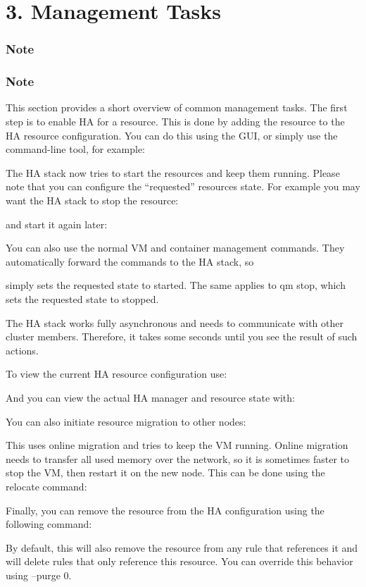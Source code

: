 \section{3. Management Tasks}

\subsubsection{Note}

\subsubsection{Note}

This section provides a short overview of common management tasks. The first step is to enable HA for a resource. This is done by adding the resource to the HA resource configuration. You can do this using the GUI, or simply use the command-line tool, for example:

The HA stack now tries to start the resources and keep them running. Please note that you can configure the “requested” resources state. For example you may want the HA stack to stop the resource:

and start it again later:

You can also use the normal VM and container management commands. They automatically forward the commands to the HA stack, so

simply sets the requested state to started. The same applies to qm stop, which sets the requested state to stopped.

The HA stack works fully asynchronous and needs to communicate with other cluster members. Therefore, it takes some seconds until you see the result of such actions.

To view the current HA resource configuration use:

And you can view the actual HA manager and resource state with:

You can also initiate resource migration to other nodes:

This uses online migration and tries to keep the VM running. Online migration needs to transfer all used memory over the network, so it is sometimes faster to stop the VM, then restart it on the new node. This can be done using the relocate command:

Finally, you can remove the resource from the HA configuration using the following command:

By default, this will also remove the resource from any rule that references it and will delete rules that only reference this resource. You can override this behavior using --purge 0.

